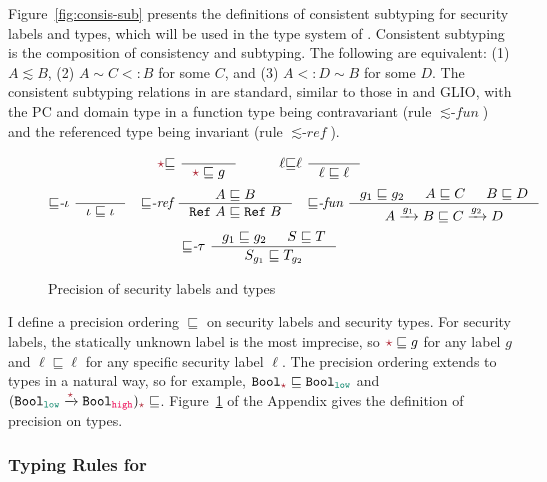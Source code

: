 Figure~\ref{fig:consis-sub} presents the definitions of consistent subtyping for
security labels and types, which will be used in the type system of \Surface.
Consistent subtyping is the composition of consistency and subtyping. The
following are equivalent: (1) $A \lesssim B$, (2) $A \sim C <: B$ for some $C$,
and (3) $A <: D \sim B$ for some $D$. The consistent subtyping relations in
\Surface are standard, similar to those in \GSLRef and GLIO, with the PC and
domain type in a function type being contravariant (rule
${\lesssim}\textit{-fun}$) and the referenced type being invariant
(rule ${\lesssim}\textit{-ref}$).

\begin{figure}[tbp]
  \raggedright
  \begin{gather*}
    \unk{\sqsubseteq}~
    \inference{}{\unk \sqsubseteq g}
    \qquad\quad
    \ell{\sqsubseteq}\ell~
    \inference{}{\ell \sqsubseteq \ell}
  \end{gather*}
  \begin{gather*}
    {\sqsubseteq}\textit{-}\iota~
    \inference{}{\iota \sqsubseteq \iota}
    \quad
        {\sqsubseteq}\textit{-ref}~
        \inference{A \sqsubseteq B}{\Refer{A} \sqsubseteq \Refer{B}}
        \quad
            {\sqsubseteq}\textit{-fun}~
            \inference{g_1 \sqsubseteq g_2 &
              A \sqsubseteq C &
              B \sqsubseteq D}
                      {\Fun{A}{g_1}{B} \sqsubseteq \Fun{C}{g_2}{D}}
  \end{gather*}
  \begin{gather*}
    {\sqsubseteq}\textit{-}\tau~
    \inference{g_1 \sqsubseteq g_2 & S \sqsubseteq T}{S_{g_1} \sqsubseteq T_{g_2}}
  \end{gather*}
  \caption{Precision of security labels and types}
  \label{fig:type-prec}
\end{figure}

I define a precision ordering $\sqsubseteq$ on security labels and security
types. For security labels, the statically unknown label \unk is the most
imprecise, so $\unk \sqsubseteq g$ for any label $g$ and $\ell \sqsubseteq \ell$
for any specific security label $\ell$. The precision ordering extends to types
in a natural way, so for example, $\Bool_{\unk} \sqsubseteq \Bool_{\low}$ and
$(\Fun{\Bool_{\low}}{\unk}{\Bool_{\high}})_{\unk} \sqsubseteq $.
Figure~\ref{fig:type-prec} of the Appendix gives the definition of precision on
types.

\subsubsection{Typing Rules for \Surface}

